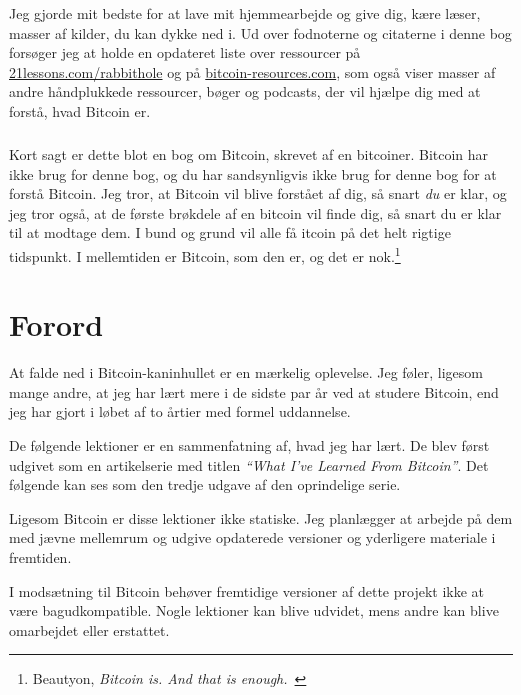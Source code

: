 \documentclass[paper=6in:9in,pagesize=pdftex,headinclude=on,footinclude=on,12pt]{scrbook}
\begin{document}
Jeg gjorde mit bedste for at lave mit hjemmearbejde og give dig, kære læser, masser af kilder, du kan dykke ned i. Ud over fodnoterne og citaterne i denne bog forsøger jeg at holde en opdateret liste over ressourcer på \href{https://21lessons.com/rabbithole}{21lessons.com/rabbithole} og på \href{https://bitcoin-resources.com}{bitcoin-resources.com}, som også viser masser af andre håndplukkede ressourcer, bøger og podcasts, der vil hjælpe dig med at forstå, hvad Bitcoin er.\paragraph{} Kort sagt er dette blot en bog om Bitcoin, skrevet af en bitcoiner. Bitcoin har ikke brug for denne bog, og du har sandsynligvis ikke brug for denne bog for at forstå Bitcoin. Jeg tror, at Bitcoin vil blive forstået af dig, så snart \textit{du} er klar, og jeg tror også, at de første brøkdele af en bitcoin vil finde dig, så snart du er klar til at modtage dem. I bund og grund vil alle få  \bitcoinB{}itcoin på det helt rigtige tidspunkt. I mellemtiden er Bitcoin, som den er, og det er nok.\footnote{Beautyon, \textit{Bitcoin is. And that is enough.}~\cite{bitcoin-is}}

\chapter*{Forord}

At falde ned i Bitcoin-kaninhullet er en mærkelig oplevelse. Jeg føler, ligesom mange andre, at jeg har lært mere i de sidste par år ved at studere Bitcoin, end jeg har gjort i løbet af to årtier med formel uddannelse.

De følgende lektioner er en sammenfatning af, hvad jeg har lært. De blev først udgivet som en artikelserie med titlen \textit{\enquote{What I’ve Learned From Bitcoin}}.%
%
%
 Det følgende kan ses som den tredje udgave af den oprindelige serie.

Ligesom Bitcoin er disse lektioner ikke statiske. Jeg planlægger at arbejde på dem med jævne mellemrum og udgive opdaterede versioner og yderligere materiale i fremtiden.

I modsætning til Bitcoin behøver fremtidige versioner af dette projekt ikke at være bagudkompatible. Nogle lektioner kan blive udvidet, mens andre kan blive omarbejdet eller erstattet.
\end{document}
